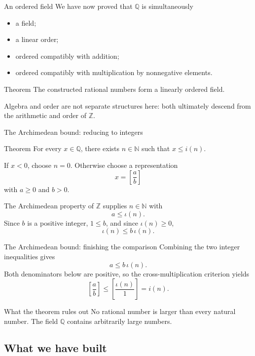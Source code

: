 \documentclass[aspectratio=169,11pt]{beamer}
\newcommand{\N}{\mathbb N}
\newcommand{\Z}{\mathbb Z}
\newcommand{\Q}{\mathbb Q}
\newcommand{\qcl}[2]{\left[\frac{#1}{#2}\right]}
\begin{document}
\begin{frame}{An ordered field}
  We have now proved that \(\Q\) is simultaneously
  \begin{itemize}
    \item a field;
    \item a linear order;
    \item ordered compatibly with addition;
    \item ordered compatibly with multiplication by nonnegative elements.
  \end{itemize}

  \begin{block}{Theorem}
    The constructed rational numbers form a linearly ordered field.
  \end{block}

  Algebra and order are not separate structures here: both ultimately descend
  from the arithmetic and order of \(\Z\).
\end{frame}

\begin{frame}{The Archimedean bound: reducing to integers}
  \small
  \begin{block}{Theorem}
    For every \(x\in\Q\), there exists \(n\in\N\) such that \(x\le i(n)\).
  \end{block}

  If \(x<0\), choose \(n=0\).  Otherwise choose a representation
  \[
    x=\qcl ab
  \]
  with \(a\ge0\) and \(b>0\).

  The Archimedean property of \(\Z\) supplies \(n\in\N\) with
  \[
    a\le\iota(n).
  \]
  Since \(b\) is a positive integer, \(1\le b\), and since
  \(\iota(n)\ge0\),
  \[
    \iota(n)\le b\,\iota(n).
  \]
\end{frame}

\begin{frame}{The Archimedean bound: finishing the comparison}
  Combining the two integer inequalities gives
  \[
    a\le b\,\iota(n).
  \]
  Both denominators below are positive, so the cross-multiplication criterion
  yields
  \[
    \qcl ab
      \le
    \qcl{\iota(n)}1=i(n).
  \]

  \begin{alertblock}{What the theorem rules out}
    No rational number is larger than every natural number.  The field \(\Q\)
    contains arbitrarily large numbers.
  \end{alertblock}
\end{frame}

\subsection{What we have built}
\end{document}
